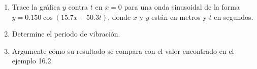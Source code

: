 \item \begin{enumerate}
    \item Trace la gráfica $y$ contra $t$ en $x = 0$ para una onda sinusoidal de la forma $y = 0.150 \cos(15.7x - 50.3t)$, donde $x$ y $y$ están en metros y $t$ en segundos.
    \item Determine el periodo de vibración.
    \item Argumente cómo su resultado se compara con el valor encontrado en el ejemplo 16.2.
\end{enumerate}